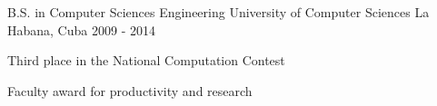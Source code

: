 


\begin{cventries}


\cventry
{B.S. in Computer Sciences Engineering} %
{University of Computer Sciences} %
{La Habana, Cuba} %
{2009 - 2014} %
{ %
\begin{cvitems}
\item {Third place in the National Computation Contest}
\item {Faculty award for productivity and research}
\end{cvitems}
}

\end{cventries}